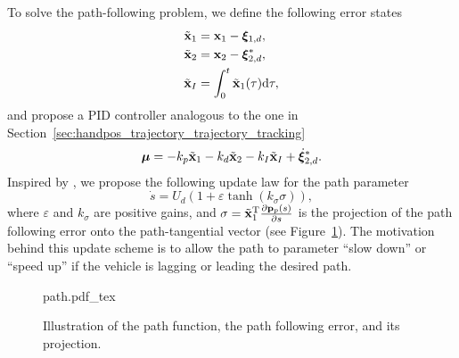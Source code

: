 To solve the path-following problem, we define the following error states
\begin{subequations}
    \begin{align}
        \tilde{\mathbf{x}}_1 &= \mathbf{x}_1 - \bm{\xi}_{1, d}, \\
        \tilde{\mathbf{x}}_2 &= \mathbf{x}_2 - \bm{\xi}_{2, d}^{*}, \\
        \tilde{\mathbf{x}}_I &= \int_{0}^t \tilde{\mathbf{x}}_1(\tau) {\rm d}\tau,
    \end{align}
\end{subequations}
and propose a PID controller analogous to the one in Section~\ref{sec:handpos_trajectory_trajectory_tracking}
\begin{equation}
    \bm{\mu} = -k_p\tilde{\mathbf{x}}_1 - k_d\tilde{\mathbf{x}}_2 - k_I\tilde{\mathbf{x}}_I + \dot{\bm{\xi}}_{2, d}^{*}.
\end{equation}
Inspired by \cite{belleter_2019_observer}, we propose the following update law for the path parameter 
\begin{equation}
    \dot{s} = U_d\left(1 + \varepsilon\tanh\left(k_{\sigma}\sigma\right)\right), \label{eq:handpos_trajectory_s_dot}
\end{equation}
where $\varepsilon$ and $k_{\sigma}$ are positive gains, and $\sigma = \tilde{\mathbf{x}}_1^{\mathrm{T}} \frac{\partial \mathbf{p}_p(s)}{\partial s}$ is the projection of the path following error onto the path-tangential vector (see Figure~\ref{fig:handpos_trajectory_path}).
The motivation behind this update scheme is to allow the path to parameter ``slow down'' or ``speed up'' if the vehicle is lagging or leading the desired path.

\begin{figure}[tb]
    \centering
    \def\svgwidth{0.6 \textwidth}
    {path.pdf_tex}
    \vspace*{-2mm}
    \caption{Illustration of the path function, the path following error, and its projection.}
    \label{fig:handpos_trajectory_path}
\end{figure}

